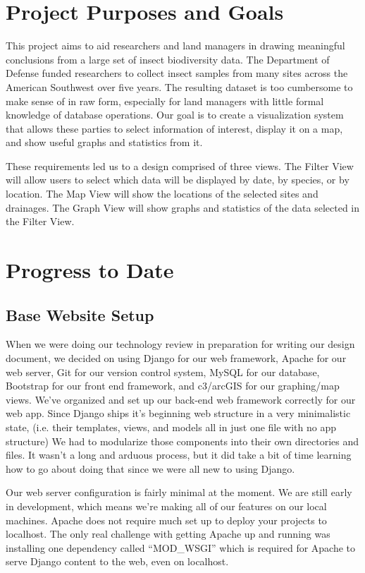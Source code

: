 \documentclass[journal]{IEEEtran}
\begin{document}
\section{Project Purposes and Goals}
This project aims to aid researchers and land managers in drawing meaningful
conclusions from a large set of insect biodiversity data. The Department of
Defense funded researchers to collect insect samples from many sites across the
American Southwest over five years. The resulting dataset is too cumbersome to
make sense of in raw form, especially for land managers with little formal
knowledge of database operations. Our goal is to create a visualization system
that allows these parties to select information of interest, display it on a
map, and show useful graphs and statistics from it.


These requirements led us to a design comprised of three views. The Filter
View will allow users to select which data will be displayed by date, by
species, or by location. The Map View will show the locations of the selected
sites and drainages. The Graph View will show graphs and statistics of the data
selected in the Filter View.


\section{Progress to Date}

\subsection{Base Website Setup}
When we were doing our technology review in preparation for writing our design
document, we decided on using Django for our web framework, Apache for our web
server, Git for our version control system, MySQL for our database, Bootstrap
for our front end framework, and c3/arcGIS for our graphing/map views.
We’ve organized and set up our back-end web framework correctly for our web
app. Since Django ships it’s beginning web structure in a very minimalistic
state, (i.e. their templates, views, and models all in just one file with
no app structure) We had to modularize those components into their own
directories and files. It wasn’t a long and arduous process, but it did
take a bit of time learning how to go about doing that since we were all
new to using Django.


Our web server configuration is fairly minimal at the moment. We are still
early in development, which means we’re making all of our features on our local
machines. Apache does not require much set up to deploy your projects to
localhost. The only real challenge with getting Apache up and running was
installing one dependency called “MOD_WSGI” which is required for Apache to
serve Django content to the web, even on localhost.
\end{document}
